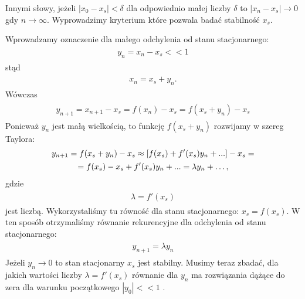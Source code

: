 \documentclass[a4paper,12pt,polish]{sphinxmanual}
\begin{document}
Innymi słowy, jeżeli $|x_0 - x_s| < \delta$  dla odpowiednio małej liczby $\delta$   to   $|x_n - x_s| \to 0$  gdy $n \to \infty$. Wyprowadzimy kryterium które pozwala badać stabilność $x_s$.

Wprowadzamy oznaczenie dla małego odchylenia od stanu stacjonarnego:
\label{ch1/chI031:equation-eqn16}\begin{gather}
\begin{split}y_n = x_n - x_s << 1\end{split}\label{ch1/chI031-eqn16}
\end{gather}
stąd
\label{ch1/chI031:equation-eqn16a}\begin{gather}
\begin{split}x_n = x_s + y_n.\end{split}\label{ch1/chI031-eqn16a}
\end{gather}
Wówczas
\label{ch1/chI031:equation-eqn17}\begin{gather}
\begin{split}y_{n+1} = x_{n+1} - x_s = f(x_n) - x_s  = f( x_s + y_n) - x_s\end{split}\label{ch1/chI031-eqn17}
\end{gather}
Ponieważ $y_n$ jest małą wielkością, to funkcję $f(x_s + y_n)$ rozwijamy w szereg Taylora:
\label{ch1/chI031:equation-eqn18}\begin{gather}
\begin{split}y_{n+1} =  f( x_s + y_n) - x_s \approx [f(x_s) + f'(x_s) y_n + ...] - x_s  =\end{split}\label{ch1/chI031-eqn18}\\\begin{split}= f(x_s) - x_s  + f'(x_s) y_n+ ...  = \lambda y_n + \dots,\end{split}\notag
\end{gather}
gdzie
\label{ch1/chI031:equation-eqn18}\begin{gather}
\begin{split}\lambda = f'(x_s)\end{split}\label{ch1/chI031-eqn18}
\end{gather}
jest liczbą. Wykorzystaliśmy tu równość dla stanu stacjonarnego: $x_s = f(x_s)$.
W ten sposób otrzymaliśmy równanie rekurencyjne dla odchylenia od stanu stacjonarnego:
\label{ch1/chI031:equation-eqn19}\begin{gather}
\begin{split}y_{n+1} = \lambda y_n\end{split}\label{ch1/chI031-eqn19}
\end{gather}
Jeżeli $y_{n} \to 0$  to stan stacjonarny $x_s$ jest stabilny. Musimy teraz zbadać,  dla jakich wartości liczby $\lambda = f'(x_s)$ równanie dla $y_n$  ma rozwiązania dążące do zera dla warunku początkowego $|y_0| << 1$ .
\end{document}

